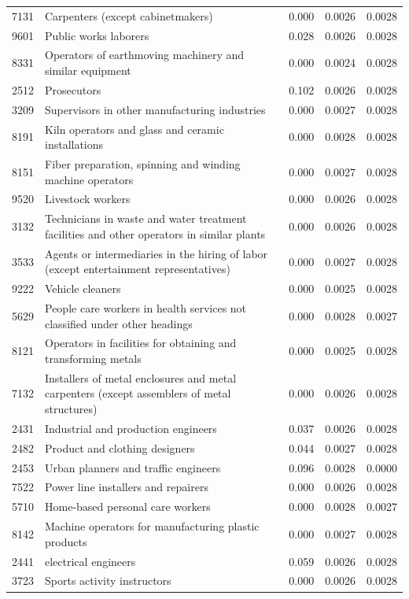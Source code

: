 \begin{longtable}{p{}>{\raggedright\arraybackslash}p{}rrr}
7131 & Carpenters (except cabinetmakers) & 0.000 & 0.0026 & 0.0028 \\
9601 & Public works laborers & 0.028 & 0.0026 & 0.0028 \\
8331 & Operators of earthmoving machinery and similar equipment & 0.000 & 0.0024 & 0.0028 \\
2512 & Prosecutors & 0.102 & 0.0026 & 0.0028 \\
3209 & Supervisors in other manufacturing industries & 0.000 & 0.0027 & 0.0028 \\
8191 & Kiln operators and glass and ceramic installations & 0.000 & 0.0028 & 0.0028 \\
8151 & Fiber preparation, spinning and winding machine operators & 0.000 & 0.0027 & 0.0028 \\
9520 & Livestock workers & 0.000 & 0.0026 & 0.0028 \\
3132 & Technicians in waste and water treatment facilities and other operators in similar plants & 0.000 & 0.0026 & 0.0028 \\
3533 & Agents or intermediaries in the hiring of labor (except entertainment representatives) & 0.000 & 0.0027 & 0.0028 \\
9222 & Vehicle cleaners & 0.000 & 0.0025 & 0.0028 \\
5629 & People care workers in health services not classified under other headings & 0.000 & 0.0028 & 0.0027 \\
8121 & Operators in facilities for obtaining and transforming metals & 0.000 & 0.0025 & 0.0028 \\
7132 & Installers of metal enclosures and metal carpenters (except assemblers of metal structures) & 0.000 & 0.0026 & 0.0028 \\
2431 & Industrial and production engineers & 0.037 & 0.0026 & 0.0028 \\
2482 & Product and clothing designers & 0.044 & 0.0027 & 0.0028 \\
2453 & Urban planners and traffic engineers & 0.096 & 0.0028 & 0.0000 \\
7522 & Power line installers and repairers & 0.000 & 0.0026 & 0.0028 \\
5710 & Home-based personal care workers & 0.000 & 0.0028 & 0.0027 \\
8142 & Machine operators for manufacturing plastic products & 0.000 & 0.0027 & 0.0028 \\
2441 & electrical engineers & 0.059 & 0.0026 & 0.0028 \\
3723 & Sports activity instructors & 0.000 & 0.0026 & 0.0028 \\

\end{longtable}

